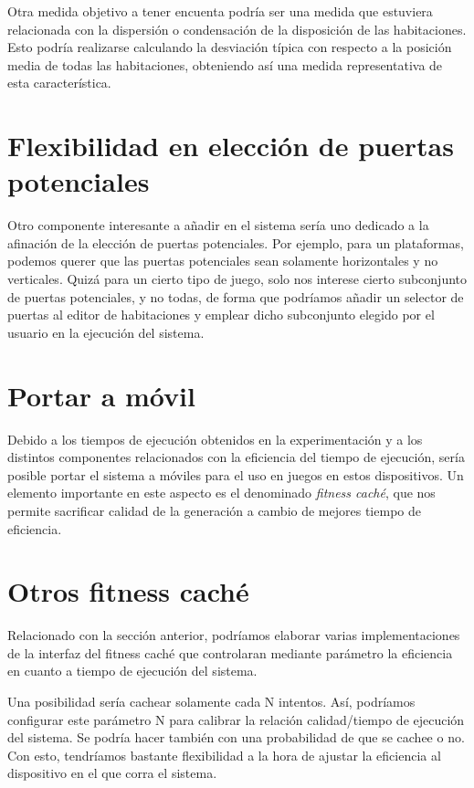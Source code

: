 Otra medida objetivo a tener encuenta podría ser una medida que estuviera relacionada con la dispersión o condensación de la disposición de las habitaciones. Esto podría realizarse calculando la desviación típica con respecto a la posición media de todas las habitaciones, obteniendo así una medida representativa de esta característica.

\section{Flexibilidad en elección de puertas potenciales}

Otro componente interesante a añadir en el sistema sería uno dedicado a la afinación de la elección de puertas potenciales. Por ejemplo, para un plataformas, podemos querer que las puertas potenciales sean solamente horizontales y no verticales. Quizá para un cierto tipo de juego, solo nos interese cierto subconjunto de puertas potenciales, y no todas, de forma que podríamos añadir un selector de puertas al editor de habitaciones y emplear dicho subconjunto elegido por el usuario en la ejecución del sistema.

\section{Portar a móvil}

Debido a los tiempos de ejecución obtenidos en la experimentación y a los distintos componentes relacionados con la eficiencia del tiempo de ejecución, sería posible portar el sistema a móviles para el uso en juegos en estos dispositivos. Un elemento importante en este aspecto es el denominado \emph{fitness caché}, que nos permite sacrificar calidad de la generación a cambio de mejores tiempo de eficiencia.

\section{Otros fitness caché}

Relacionado con la sección anterior, podríamos elaborar varias implementaciones de la interfaz del fitness caché que controlaran mediante parámetro la eficiencia en cuanto a tiempo de ejecución del sistema.

Una posibilidad sería cachear solamente cada N intentos. Así, podríamos configurar este parámetro N para calibrar la relación calidad/tiempo de ejecución del sistema. Se podría hacer también con una probabilidad de que se cachee o no. Con esto, tendríamos bastante flexibilidad a la hora de ajustar la eficiencia al dispositivo en el que corra el sistema.

